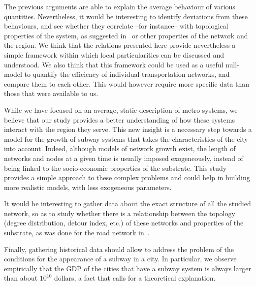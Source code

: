 The previous arguments are able to explain the average behaviour of various
quantities. Nevertheless, it would be interesting to identify deviations from
these behaviours, and see whether they correlate --for instance-- with
topological properties of the system, as suggested in~\cite{Derrible:2009} or
other properties of the network and the region. We think that the relations
presented here provide  nevertheless a simple framework within which local
particularities can be discussed and understood. We also think that this
framework could be used as a useful null-model to quantify the efficiency of
individual transportation networks, and compare them to each other. This would
however require more specific data than those that were available to us. 

While we have focused on an average, static description of metro systems, we
believe that our study provides a better understanding of how these systems
interact with the region they serve. This new insight is a necessary step
towards a model for the growth of subway systems that takes the characteristics
of the city into account. Indeed, although models of network growth exist, the
length of networks and nodes at a given time is usually imposed exogeneously,
instead of being linked to the socio-economic properties of the substrate. This
study provides a simple approach to these complex problems and could help in
building more realistic models, with less exogeneous parameters.

It would be interesting to gather data about the exact structure of all the
studied network, so as to study whether there is a relationship between the
topology (degree distribution, detour index, etc.) of these networks and
properties of the substrate, as was done for the road network
in~\cite{Levinson:2012}.

Finally, gathering historical data should allow to address the problem of the
conditions for the appearance of a subway in a city. In particular, we observe
empirically that the GDP of the cities that have a subway system is always
larger than about $10^{10}$ dollars, a fact that calls for a theoretical
explanation.


